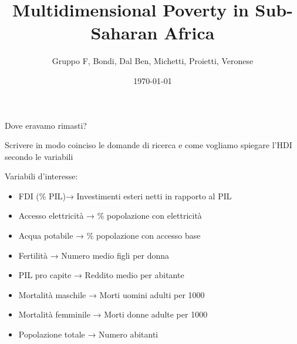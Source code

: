 \documentclass{beamer}
\title{Multidimensional Poverty in Sub-Saharan Africa}
\author{Gruppo F, Bondi, Dal Ben, Michetti, Proietti, Veronese}
\date{\today}
\begin{document}
	
	\begin{frame}
		\titlepage
	\end{frame}
	
	\begin{frame}{Dove eravamo rimasti?}
		\begin{itemize}
			Scrivere in modo coinciso le domande di ricerca e come vogliamo spiegare l'HDI secondo le variabili
		\end{itemize}
		
	\end{frame}
	
	\begin{frame}{Variabili d'interesse:}
		\begin{itemize}
			\item FDI (\% PIL)→ Investimenti esteri netti in rapporto al PIL
			\item Accesso elettricità → \% popolazione con elettricità
			\item Acqua potabile → \% popolazione con accesso base
			\item Fertilità → Numero medio figli per donna
			\item PIL pro capite → Reddito medio per abitante
			\item Mortalità maschile → Morti uomini adulti per 1000
			\item Mortalità femminile → Morti donne adulte per 1000
			\item Popolazione totale → Numero abitanti
		\end{itemize}
	
	\end{frame}
	
	\begin{frame}
	\begin{figure}
		
	\end{figure}
	\end{frame}

	
\end{document}
